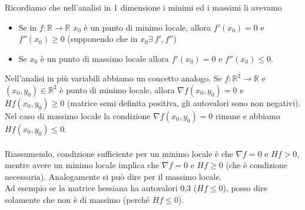 \hspace{-15pt}Ricordiamo che nell'analisi in 1 dimensione i minimi ed i massimi li avevamo
\begin{itemize}
    \item Se in $f: \mathbb{R}\to \mathbb{R}$ $x_0$ è un punto di minimo locale, allora $f'(x_0) = 0$ e $f''(x_0) \geq 0$ (supponendo che in $x_0 \exists \: f',f''$)
    \item Se $x_0$ è un punto di massimo locale allora $f'(x_0) = 0$ e $f''(x_0) \leq 0$.
\end{itemize}
Nell'analisi in più variabili abbiamo un concetto analogo. Se $f: \mathbb{R}^2 \to \mathbb{R}$ e $(x_0, y_0) \in \mathbb{R}^2$ è punto di minimo locale, allora $\nabla f(x_0, y_0) = 0$ e $Hf(x_0, y_0) \geq 0$ (matrice semi definita positiva, gli autovalori sono non negativi). Nel caso di massimo locale la condizione $\nabla f(x_0, y_0) = 0$ rimane e abbiamo $Hf(x_0, y_0) \leq 0$.\\\\
Riassumendo, condizione sufficiente per un minimo locale è che $\nabla f = 0$ e $Hf > 0$, mentre avere un minimo locale implica che $\nabla f = 0$ e $Hf \geq 0$ (che è condizione necessaria). Analogamente si può dire per il massimo locale.\\
Ad esempio se la matrice hessiana ha autovalori 0,3 ($Hf \leq 0$), posso dire solamente che non è di massimo (perché $Hf \leq 0$).


